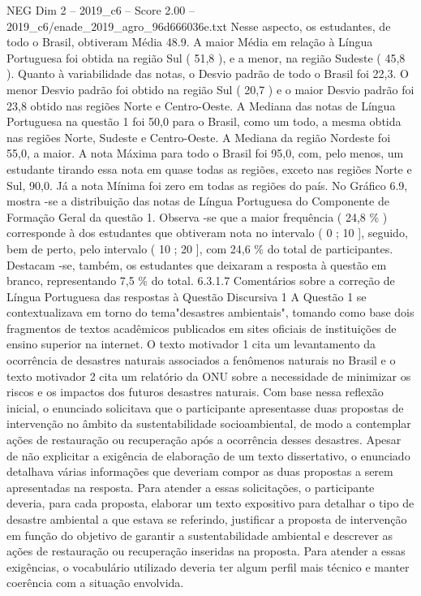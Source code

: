 \begin{textsample}{NEG Dim 2 – 2019\_c6 – Score 2.00 – 2019\_c6/enade\_2019\_agro\_96d666036e.txt}
Nesse aspecto, os estudantes, de todo o Brasil, obtiveram Média 48.9.
A maior Média em relação à Língua Portuguesa foi obtida na região Sul ( 51,8 ), e a menor, na região Sudeste ( 45,8 ).
Quanto à variabilidade das notas, o Desvio padrão de todo o Brasil foi 22,3.
O menor Desvio padrão foi obtido na região Sul ( 20,7 ) e o maior Desvio padrão foi 23,8 obtido nas regiões Norte e Centro-Oeste.
A Mediana das notas de Língua Portuguesa na questão 1 foi 50,0 para o Brasil, como um todo, a mesma obtida nas regiões Norte, Sudeste e Centro-Oeste.
A Mediana da região Nordeste foi 55,0, a maior.
A nota Máxima para todo o Brasil foi 95,0, com, pelo menos, um estudante tirando essa nota em quase todas as regiões, exceto nas regiões Norte e Sul, 90,0.
Já a nota Mínima foi zero em todas as regiões do país.
No Gráfico 6.9, mostra -se a distribuição das notas de Língua Portuguesa do Componente de Formação Geral da questão 1.
Observa -se que a maior frequência ( 24,8 \% ) corresponde à dos estudantes que obtiveram nota no intervalo ( 0 ; 10 ], seguido, bem de perto, pelo intervalo ( 10 ; 20 ], com 24,6 \% do total de participantes.
Destacam -se, também, os estudantes que deixaram a resposta à questão em branco, representando 7,5 \% do total. 6.3.1.7 Comentários sobre a correção de Língua Portuguesa das respostas à Questão Discursiva 1 A Questão 1 se contextualizava em torno do tema"desastres ambientais", tomando como base dois fragmentos de textos acadêmicos publicados em sites oficiais de instituições de ensino superior na internet.
O texto motivador 1 cita um levantamento da ocorrência de desastres naturais associados a fenômenos naturais no Brasil e o texto motivador 2 cita um relatório da ONU sobre a necessidade de minimizar os riscos e os impactos dos futuros desastres naturais.
Com base nessa reflexão inicial, o enunciado solicitava que o participante apresentasse duas propostas de intervenção no âmbito da sustentabilidade socioambiental, de modo a contemplar ações de restauração ou recuperação após a ocorrência desses desastres.
Apesar de não explicitar a exigência de elaboração de um texto dissertativo, o enunciado detalhava várias informações que deveriam compor as duas propostas a serem apresentadas na resposta.
Para atender a essas solicitações, o participante deveria, para cada proposta, elaborar um texto expositivo para detalhar o tipo de desastre ambiental a que estava se referindo, justificar a proposta de intervenção em função do objetivo de garantir a sustentabilidade ambiental e descrever as ações de restauração ou recuperação inseridas na proposta.
Para atender a essas exigências, o vocabulário utilizado deveria ter algum perfil mais técnico e manter coerência com a situação envolvida.

\end{textsample}
